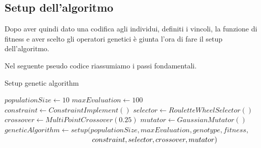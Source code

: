 \documentclass[a4paper, 11pt, oneside]{report}
\begin{document}
                \subsection{Setup dell'algoritmo}
                Dopo aver quindi dato una codifica agli individui, definiti i vincoli, la funzione di fitness e aver
                scelto gli operatori genetici è giunta l'ora di fare il setup dell'algoritmo.
                \par \noindent Nel seguente pseudo codice riassumiamo i passi fondamentali.
                \medskip
                \begin{algorithm}
                \caption{Setup genetic algorithm}
                    \label{setup:ga}
                    \begin{algorithmic}[1]
                        \State $populationSize \gets 10$
                        \State $maxEvaluation \gets 100$
                        \State
                        \State $constraint \gets ConstraintImplement()$
                        \State $selector \gets RouletteWheelSelector()$
                        \State $crossover \gets MultiPointCrossover(0.25)$
                        \State $mutator \gets GaussianMutator()$
                        \State
                        \State $geneticAlgorithm \gets setup(populationSize, maxEvaluation, genotype, fitness,$
                        \State $\hspace*{12.3em} constraint, selector, crossover, mutator)$
                    \end{algorithmic}
                \end{algorithm}
\end{document}
